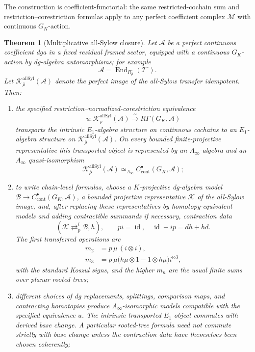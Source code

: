 \documentclass[11pt]{article}
\newtheorem{theorem}{Theorem}[section]
\theoremstyle{definition}
\begin{document}
The construction is coefficient-functorial: the same restricted-cochain sum and restriction--corestriction formulas apply to any perfect coefficient complex $\mathcal M$ with continuous $G_K$-action.

\begin{theorem}[Multiplicative all-Sylow closure]\label{thm:all-sylow-ainfty}
Let $\mathcal A$ be a perfect continuous coefficient dga in a fixed residual framed sector, equipped with a continuous $G_K$-action by dg-algebra automorphisms; for example
\[
 \mathcal A=\operatorname{End}_{R_{\bar\rho}^{\square}}(\mathcal T^{\square}).
\]
Let $\mathcal K_{\bar\rho}^{\mathrm{allSyl}}(\mathcal A)$ denote the perfect image of the all-Sylow transfer idempotent.  Then:
\begin{enumerate}[label=\textnormal{(\roman*)}]
\item the specified restriction--normalized-corestriction equivalence
\[
 u:\mathcal K_{\bar\rho}^{\mathrm{allSyl}}(\mathcal A)
 \xrightarrow{\ \sim\ }
 R\Gamma(G_K,\mathcal A)
\]
transports the intrinsic $E_1$-algebra structure on continuous cochains to an $E_1$-algebra structure on
$\mathcal K_{\bar\rho}^{\mathrm{allSyl}}(\mathcal A)$.
On every bounded finite-projective representative this transported object is represented by an $A_\infty$-algebra and an $A_\infty$ quasi-isomorphism
\[
 \mathcal K_{\bar\rho}^{\mathrm{allSyl}}(\mathcal A)
 \simeq_{A_\infty}
 C^\bullet_{\mathrm{cont}}(G_K,\mathcal A);
\]
\item to write chain-level formulas, choose a $K$-projective dg-algebra model $\mathcal B\to C^\bullet_{\mathrm{cont}}(G_K,\mathcal A)$, a bounded projective representative $\mathcal K$ of the all-Sylow image, and, after replacing these representatives by homotopy-equivalent models and adding contractible summands if necessary, contraction data
\[
 \left(
 \mathcal K
 \mathop{\rightleftarrows}^{i}_{p}
 \mathcal B,
 h
 \right),
 \qquad
 p i=\operatorname{id},
 \quad
 \operatorname{id}-i p=dh+hd.
\]
The first transferred operations are
\begin{align}
 m_2&=p\,\mu\,(i\otimes i),\label{eq:all-sylow-m2}\\
 m_3&=p\,\mu\bigl(h\mu\otimes1-1\otimes h\mu\bigr)i^{\otimes3},\label{eq:all-sylow-m3}
\end{align}
with the standard Koszul signs, and the higher $m_n$ are the usual finite sums over planar rooted trees;
\item different choices of dg replacements, splittings, comparison maps, and contracting homotopies produce $A_\infty$-isomorphic models compatible with the specified equivalence $u$.  The intrinsic transported $E_1$ object commutes with derived base change.  A particular rooted-tree formula need not commute strictly with base change unless the contraction data have themselves been chosen coherently;

\end{enumerate}
\end{theorem}
\end{document}
